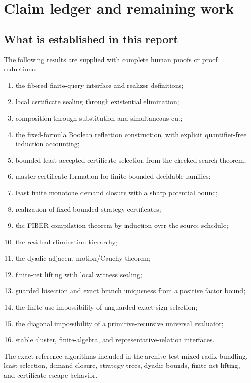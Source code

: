 \section{Claim ledger and remaining work}
\label{sec:status}

\subsection{What is established in this report}

The following results are supplied with complete human proofs or proof
reductions:

\begin{enumerate}
\item the fibered finite-query interface and realizer definitions;
\item local certificate sealing through existential elimination;
\item composition through substitution and simultaneous cut;
\item the fixed-formula Boolean reflection construction, with explicit
      quantifier-free induction accounting;
\item bounded least accepted-certificate selection from the checked search
      theorem;
\item master-certificate formation for finite bounded decidable families;
\item least finite monotone demand closure with a sharp potential bound;
\item realization of fixed bounded strategy certificates;
\item the FIBER compilation theorem by induction over the source schedule;
\item the residual-elimination hierarchy;
\item the dyadic adjacent-motion/Cauchy theorem;
\item finite-net lifting with local witness sealing;
\item guarded bisection and exact branch uniqueness from a positive factor
      bound;
\item the finite-use impossibility of unguarded exact sign selection;
\item the diagonal impossibility of a primitive-recursive universal evaluator;
\item stable cluster, finite-algebra, and representative-relation interfaces.
\end{enumerate}

The exact reference algorithms included in the archive test mixed-radix
bundling, least selection, demand closure, strategy trees, dyadic bounds,
finite-net lifting, and certificate escape behavior.

